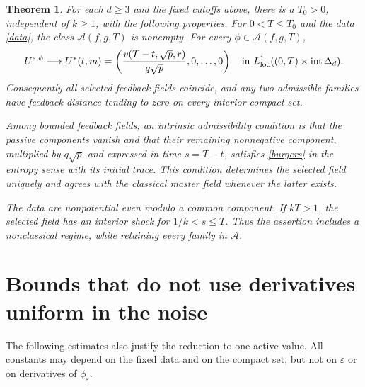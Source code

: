 \documentclass[11pt]{article}
\newtheorem{theorem}{Theorem}
\begin{document}
\begin{theorem}\label{main}
For each $d\ge3$ and the fixed cutoffs above, there is a $T_0>0$, independent of $k\ge1$, with the following properties. For $0<T\le T_0$ and the data \eqref{data}, the class $\mathcal A(f,g,T)$ is nonempty. For every $\phi\in\mathcal A(f,g,T)$,
\begin{equation}\label{convergence}
 U^{\varepsilon,\phi}\longrightarrow
 U^*(t,m)=\left(\frac{v(T-t,\sqrt p,r)}{q\sqrt p},0,\ldots,0\right)
 \quad\text{in }L^1_{\rm loc}((0,T)\times\operatorname{int}\Delta_d).
\end{equation}
Consequently all selected feedback fields coincide, and any two admissible families have feedback distance tending to zero on every interior compact set.

Among bounded feedback fields, an intrinsic admissibility condition is that the passive components vanish and that their remaining nonnegative component, multiplied by $q\sqrt p$ and expressed in time $s=T-t$, satisfies \eqref{burgers} in the entropy sense with its initial trace. This condition determines the selected field uniquely and agrees with the classical master field whenever the latter exists.

The data are nonpotential even modulo a common component. If $kT>1$, the selected field has an interior shock for $1/k<s\le T$. Thus the assertion includes a nonclassical regime, while retaining every family in $\mathcal A$.
\end{theorem}

\section{Bounds that do not use derivatives uniform in the noise}
The following estimates also justify the reduction to one active value. All constants may depend on the fixed data and on the compact set, but not on $\varepsilon$ or on derivatives of $\phi_\varepsilon$.
\end{document}
